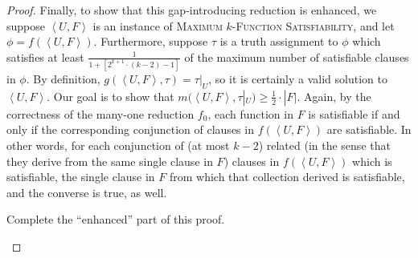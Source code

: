 \documentclass[]{article}
\newcommand{\pair}[2]{{\left\langle{#1}, {#2}\right\rangle}}
\begin{document}
\begin{proof}
  Finally, to show that this gap-introducing reduction is enhanced, we suppose $\pair{U}{F}$ is an instance of \textsc{Maximum $k$-Function Satisfiability}, and let $\phi = f(\pair{U}{F})$.
  Furthermore, suppose $\tau$ is a truth assignment to $\phi$ which satisfies at least $\frac{1}{1 + \left[2^{k + 1} \cdot (k - 2) - 1\right]}$ of the maximum number of satisfiable clauses in $\phi$.
  By definition, $g(\pair{U}{F}, \tau) = \tau|_U$, so it is certainly a valid solution to $\pair{U}{F}$.
  Our goal is to show that $m(\pair{U}{F}, \tau|_U) \geq \frac{1}{2} \cdot |F|$.
  Again, by the correctness of the many-one reduction $f_0$, each function in $F$ is satisfiable if and only if the corresponding conjunction of clauses in $f(\pair{U}{F})$ are satisfiable.
  In other words, for each conjunction of (at most $k - 2$) related (in the sense that they derive from the same single clause in $F$) clauses in $f(\pair{U}{F})$ which is satisfiable, the single clause in $F$ from which that collection derived is satisfiable, and the converse is true, as well.
  \begin{todo}
    Complete the ``enhanced'' part of this proof.
  \end{todo}
\end{proof}
\end{document}
